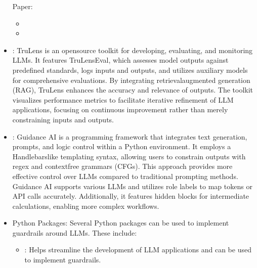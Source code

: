\documentclass[letterpaper,11pt,english]{sphinxmanual}
\begin{document}
\begin{itemize}
\sphinxAtStartPar
Paper: 
\begin{description}
\begin{itemize}
\item {} 
\sphinxAtStartPar
{}

\item {} 
\sphinxAtStartPar
{}

\end{itemize}

\end{description}

\item {} 
\sphinxAtStartPar
{}: TruLens is an open\sphinxhyphen{}source toolkit for developing,
evaluating, and monitoring LLMs. It features TruLens\sphinxhyphen{}Eval, which
assesses model outputs against predefined standards, logs inputs and
outputs, and utilizes auxiliary models for comprehensive evaluations.
By integrating retrieval\sphinxhyphen{}augmented generation (RAG), TruLens enhances
the accuracy and relevance of outputs. The toolkit visualizes
performance metrics to facilitate iterative refinement of LLM
applications, focusing on continuous improvement rather than merely
constraining inputs and outputs.

\item {} 
\sphinxAtStartPar
{}: Guidance AI is a programming framework that
integrates text generation, prompts, and logic control within a Python
environment. It employs a Handlebars\sphinxhyphen{}like templating syntax, allowing
users to constrain outputs with regex and context\sphinxhyphen{}free grammars
(CFGs). This approach provides more effective control over LLMs
compared to traditional prompting methods. Guidance AI supports
various LLMs and utilizes role labels to map tokens or API calls
accurately. Additionally, it features hidden blocks for intermediate
calculations, enabling more complex workflows.

\item {} 
\sphinxAtStartPar
Python Packages: Several Python packages can be used to implement
guardrails around LLMs. These include:
\begin{itemize}
\item {} 
\sphinxAtStartPar
{}: Helps streamline the development of LLM applications
and can be used to implement guardrails.


\end{itemize}
\end{itemize}
\end{document}
